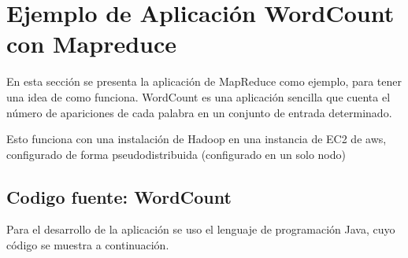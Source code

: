 \section{Ejemplo de Aplicación WordCount con Mapreduce}
\justify
En esta sección se presenta la aplicación de MapReduce como ejemplo, para tener una idea de como funciona.
WordCount es una aplicación sencilla que cuenta el número de apariciones de cada palabra en un conjunto de entrada determinado.

Esto funciona con una instalación de Hadoop en una instancia de EC2 de aws, configurado de forma pseudodistribuida (configurado en un solo nodo) 


 \subsection{Codigo fuente: WordCount}

 Para el desarrollo de la aplicación se uso el lenguaje de programación Java, cuyo código se muestra a continuación.

